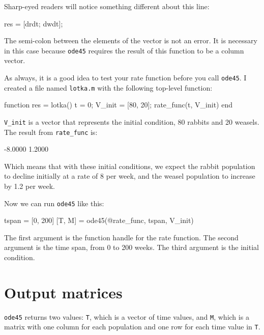 \documentclass[
]{book}
\numberwithin{Answer}{chapter}
\numberwithin{Exercise}{chapter}
\begin{document}
Sharp-eyed readers will notice something different about this line:

\begin{code}
    res = [drdt; dwdt];
\end{code}

The semi-colon between the elements of the vector is not an error.  It
is necessary in this case because {\tt ode45} requires the result of
this function to be a column vector.


As always, it is a good idea to test your rate function before you call {\tt ode45}.  I created a file named {\tt lotka.m} with the following top-level function:

\begin{code}
function res = lotka()
    t = 0;
    V_init = [80, 20];
    rate_func(t, V_init)
end
\end{code}


\verb"V_init" is a vector that represents the initial condition, 80 rabbits and 20 weasels.  The result from \verb"rate_func" is:

\begin{code}
-8.0000
 1.2000
 \end{code}
  
Which means that with these initial conditions, we expect the rabbit population to decline initially at a rate of 8 per week, and the weasel population to increase by 1.2 per week.  
  
Now we can run {\tt ode45} like this:

\begin{code}
tspan = [0, 200]
[T, M] = ode45(@rate_func, tspan, V_init)
\end{code}

The first argument is the function handle for the rate function.
The second argument is the time span, from 0 to 200 weeks.
The third argument is the initial condition.



\section{Output matrices}

{\tt ode45} returns two values: {\tt T}, which is a vector of time values, and {\tt M}, which is a matrix with one column for each
population and one row for each time value in {\tt T}.
\end{document}
